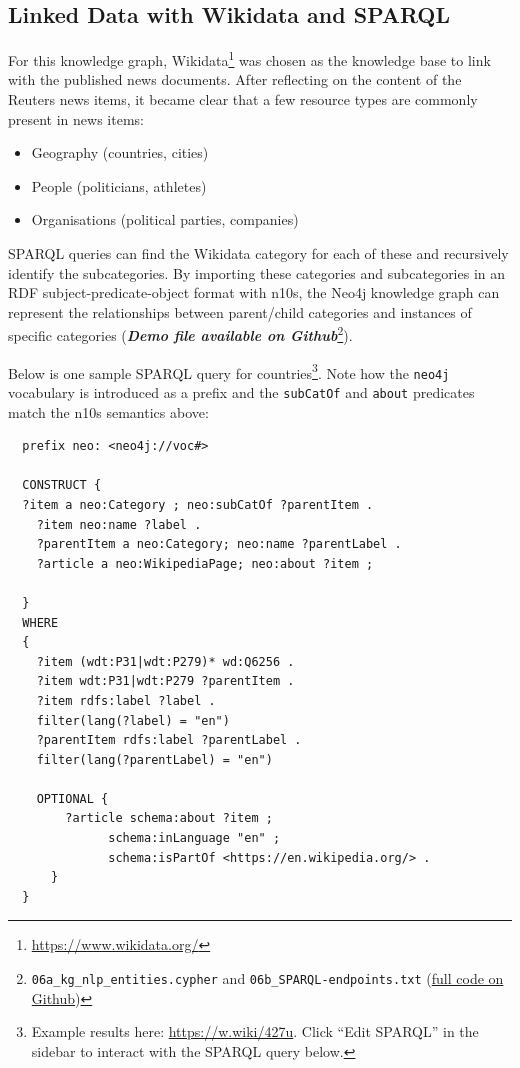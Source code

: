 \documentclass[11pt]{article}
\begin{document}
  \subsection{Linked Data with Wikidata and SPARQL}

  For this knowledge graph, Wikidata\footnote{\url{https://www.wikidata.org/}} was chosen as the knowledge base to link with the published news documents. After reflecting on the content of the Reuters news items, it became clear that a few resource types are commonly present in news items:
  \begin{itemize}
    \item{Geography (countries, cities)}
    \item{People (politicians, athletes)}
    \item{Organisations (political parties, companies)}
  \end{itemize}

  SPARQL queries can find the Wikidata category for each of these and recursively identify the subcategories. By importing these categories and subcategories in an RDF subject-predicate-object format with n10s, the Neo4j knowledge graph can represent the relationships between parent/child categories and instances of specific categories (\textit{\textbf{Demo file available on Github}}\footnote{\lstinline{06a_kg_nlp_entities.cypher} and \lstinline{06b_SPARQL-endpoints.txt} (\href{https://github.com/Birkbeck/msc-data-science-project-2020_21---files-heychrisek/}{full code on Github})}).

  Below is one sample SPARQL query for countries\footnote{Example results here: \url{https://w.wiki/427u}. Click ``Edit SPARQL'' in the sidebar to interact with the SPARQL query below.}. Note how the \lstinline{neo4j} vocabulary is introduced as a prefix and the \lstinline{subCatOf} and \lstinline{about} predicates match the n10s semantics above:
  \begin{lstlisting}
  prefix neo: <neo4j://voc#> 

  CONSTRUCT {
  ?item a neo:Category ; neo:subCatOf ?parentItem .  
    ?item neo:name ?label .
    ?parentItem a neo:Category; neo:name ?parentLabel .
    ?article a neo:WikipediaPage; neo:about ?item ;
             
  }
  WHERE 
  {
    ?item (wdt:P31|wdt:P279)* wd:Q6256 .
    ?item wdt:P31|wdt:P279 ?parentItem .
    ?item rdfs:label ?label .
    filter(lang(?label) = "en")
    ?parentItem rdfs:label ?parentLabel .
    filter(lang(?parentLabel) = "en")
    
    OPTIONAL {
        ?article schema:about ?item ;
              schema:inLanguage "en" ;
              schema:isPartOf <https://en.wikipedia.org/> .
      } 
  }
  \end{lstlisting}
\end{document}
